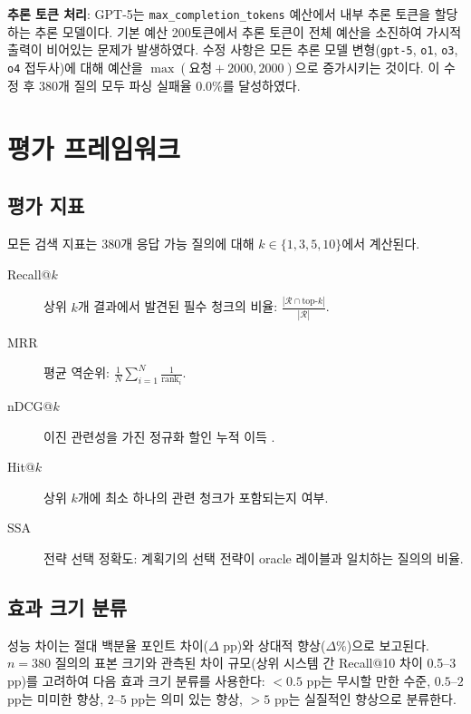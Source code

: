\textbf{추론 토큰 처리}: GPT-5는 \texttt{max\_completion\_tokens} 예산에서 내부 추론 토큰을 할당하는 추론 모델이다. 기본 예산 200토큰에서 추론 토큰이 전체 예산을 소진하여 가시적 출력이 비어있는 문제가 발생하였다. 수정 사항은 모든 추론 모델 변형(\texttt{gpt-5}, \texttt{o1}, \texttt{o3}, \texttt{o4} 접두사)에 대해 예산을 $\max(\texttt{요청} + 2000, 2000)$으로 증가시키는 것이다. 이 수정 후 380개 질의 모두 파싱 실패율 0.0\%를 달성하였다.

\section{평가 프레임워크}
\label{sec:method_eval_ko}

\subsection{평가 지표}

모든 검색 지표는 380개 응답 가능 질의에 대해 $k \in \{1, 3, 5, 10\}$에서 계산된다.

\begin{description}
    \item[Recall@$k$] 상위 $k$개 결과에서 발견된 필수 청크의 비율: $\frac{|\mathcal{R} \cap \text{top-}k|}{|\mathcal{R}|}$.
    \item[MRR] 평균 역순위: $\frac{1}{N}\sum_{i=1}^{N}\frac{1}{\text{rank}_i}$.
    \item[nDCG@$k$] 이진 관련성을 가진 정규화 할인 누적 이득 \citep{jaervelin2002ndcg}.
    \item[Hit@$k$] 상위 $k$개에 최소 하나의 관련 청크가 포함되는지 여부.
    \item[SSA] 전략 선택 정확도: 계획기의 선택 전략이 oracle 레이블과 일치하는 질의의 비율.
\end{description}

\subsection{효과 크기 분류}

성능 차이는 절대 백분율 포인트 차이($\Delta$ pp)와 상대적 향상($\Delta$\%)으로 보고된다. $n{=}380$ 질의의 표본 크기와 관측된 차이 규모(상위 시스템 간 Recall@10 차이 0.5--3 pp)를 고려하여 다음 효과 크기 분류를 사용한다: $<{0.5}$ pp는 무시할 만한 수준, $0.5$--$2$ pp는 미미한 향상, $2$--$5$ pp는 의미 있는 향상, $>{5}$ pp는 실질적인 향상으로 분류한다.
